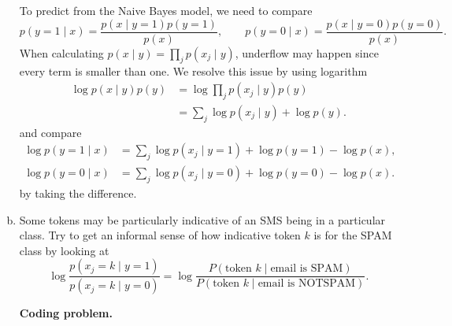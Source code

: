 \documentclass[12pt,letterpaper,boxed]{hmcpset}
\begin{document}
\begin{solution}
\begin{enumerate}[(a)]
    To predict from the Naive Bayes model, we need to compare
    \[
    p(y = 1 \mid x) = \frac{p(x \mid y = 1)p(y = 1)}{p(x)}, \qquad p(y = 0 \mid x) = \frac{p(x \mid y = 0)p(y = 0)}{p(x)}.
    \]
    When calculating $p(x \mid y) = \prod_j p(x_j \mid y)$, underflow may happen since every term is smaller than one. We resolve this issue by using logarithm
    \[
    \begin{aligned}
      \log p(x \mid y)p(y) &= \log \prod_j p(x_j \mid y) p(y) \\
      &= \sum_j \log p(x_j \mid y) + \log p(y).
    \end{aligned}
    \]
    and compare
    \[
    \begin{aligned}
      \log p(y = 1 \mid x) &= \sum_j \log p(x_j \mid y = 1)+ \log p(y=1) - \log p(x), \\
      \log p(y = 0 \mid x) &= \sum_j \log p(x_j \mid y = 0) + \log p(y=0) - \log p(x).
    \end{aligned}
    \]
    by taking the difference.

    \item Some tokens may be particularly indicative of an SMS being in a particular class. Try to get an informal sense of how indicative token $k$ is for the SPAM class by looking at 
    \[
    \log \frac{p(x_j = k \mid y = 1)}{p(x_j = k \mid y = 0)} = \log \frac{P(\text{token } k \mid \text{email is SPAM})}{P(\text{token } k \mid \text{email is NOTSPAM})}.
    \]

    \textbf{Coding problem.}
  \end{enumerate}
\end{solution}
\end{document}
